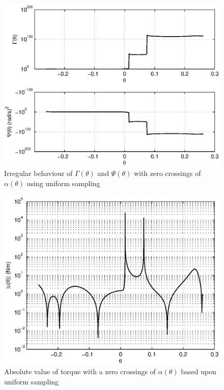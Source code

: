 \begin{figure}
	\centering
	\includegraphics[width=0.8\linewidth]{4VirtConstLib/GamPsi0Crossing.eps}
	\caption[Irregular behaviour of $\Gamma(\theta)$ and $\Psi(\theta)$ with zero crossings of $\alpha(\theta)$]{Irregular behaviour of $\Gamma(\theta)$ and $\Psi(\theta)$ with zero crossings of $\alpha(\theta)$ using uniform sampling}
	\label{fig:divergence0crossing}
\end{figure}

\begin{figure}
	\centering
	\includegraphics[width=0.8\linewidth]{4VirtConstLib/u-0Crossing}
	\caption[Absolute value of torque with zero crossings of $\alpha(\theta)$]{Absolute value of torque with a zero crossings of $\alpha(\theta)$ based upon uniform sampling}
	\label{fig:bad0crossingtorque}
\end{figure}


